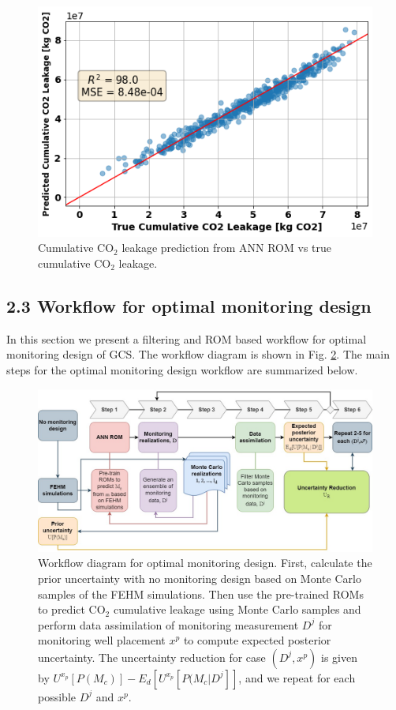 \documentclass[10pt, twoside]{article}
\begin{document}
\begin{figure} [H]
\centering
\includegraphics[width=8.5 cm]{Figure 3.png}
\caption{Cumulative CO$_2$ leakage prediction from ANN ROM vs true cumulative CO$_2$ leakage.}
\label{rom_train}
\end{figure}

\subsection*{2.3 Workflow for optimal monitoring design}
In this section we present a filtering and ROM based workflow for optimal monitoring design of GCS. The workflow diagram is shown in Fig. \ref{opt_workflow}. The main steps for the optimal monitoring design workflow are summarized below.

\begin{figure} [H]
\centering
\includegraphics[width=16 cm]{Figure 4 v2.jpg}
\caption{Workflow diagram for optimal monitoring design. First, calculate the prior uncertainty with no monitoring design based on Monte Carlo samples of the FEHM simulations. Then use the pre-trained ROMs to predict CO$_2$ cumulative leakage using Monte Carlo samples and perform data assimilation of monitoring measurement $D^j$ for monitoring well placement $x^p$ to compute expected posterior uncertainty. The uncertainty reduction for case $(D^j,x^p)$ is given by $U^{x_p}[P(M_c)] - E_d[U^{x_p}[P(M_c \vert D^j]]$, and we repeat for each possible $D^j$ and $x^p$.}
\label{opt_workflow}
\end{figure}
\end{document}
